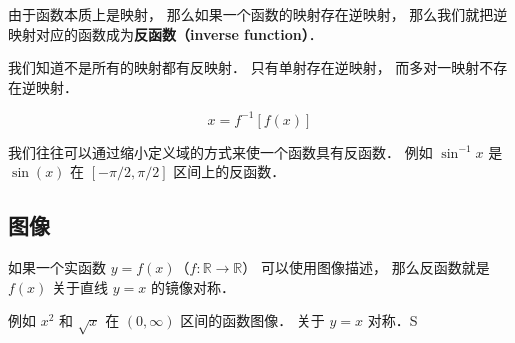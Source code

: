 
\begin{issues}
\issueDraft
\end{issues}

由于函数本质上是映射， 那么如果一个函数的映射存在逆映射， 那么我们就把逆映射对应的函数成为\textbf{反函数（inverse function）}．

我们知道不是所有的映射都有反映射． 只有单射存在逆映射， 而多对一映射不存在逆映射．

\begin{equation}
x = f^{-1}[f(x)]
\end{equation}

我们往往可以通过缩小定义域的方式来使一个函数具有反函数． 例如 $\sin^{-1} x$ 是 $\sin(x)$ 在 $[-\pi/2, \pi/2]$ 区间上的反函数．

\subsection{图像}
如果一个实函数 $y = f(x)$（$f: \mathbb R \to \mathbb R$） 可以使用图像描述， 那么反函数就是 $f(x)$ 关于直线 $y = x$ 的镜像对称．

例如 $x^2$ 和 $\sqrt{x}$ 在 $(0, \infty)$ 区间的函数图像． 关于 $y = x$ 对称．S